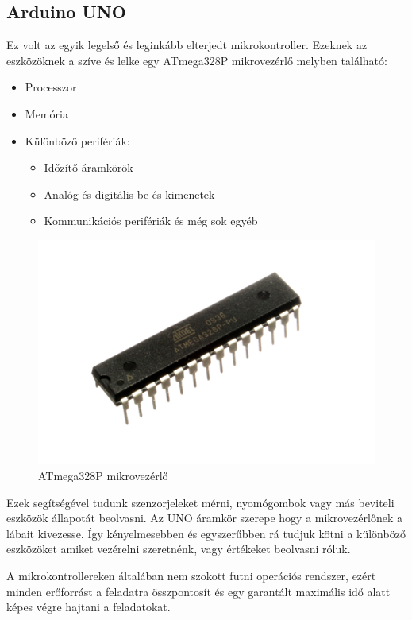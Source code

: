 \documentclass[]{thesis-ekf}
\theoremstyle{definition}
\theoremstyle{remark}
\begin{document}
\subsection{Arduino UNO}
Ez volt az egyik legelső és leginkább elterjedt mikrokontroller. Ezeknek az eszközöknek a szíve és lelke egy ATmega328P mikrovezérlő melyben található: 
\begin{itemize}
	\item Processzor
	\item Memória
	\item Különböző perifériák:
	\begin{itemize}
		\item Időzítő áramkörök
		\item Analóg és digitális be és kimenetek
		\item Kommunikációs perifériák és még sok egyéb
	\end{itemize}
\end{itemize}
\begin{figure}[th!]
	\centering
	\includegraphics[width=0.4\linewidth]{ATMEGA328P-PU}
	\caption[ATmega328P]{ATmega328P mikrovezérlő}
	\label{fig:atmega328p-pu}
\end{figure}
\pagebreak
Ezek segítségével tudunk szenzorjeleket mérni, nyomógombok vagy más beviteli eszközök állapotát beolvasni. Az UNO áramkör szerepe hogy a mikrovezérlőnek a lábait kivezesse. Így kényelmesebben és egyszerűbben rá tudjuk kötni a különböző eszközöket amiket vezérelni szeretnénk, vagy értékeket beolvasni róluk. 

A mikrokontrollereken általában nem szokott futni operációs rendszer, ezért minden erőforrást a feladatra összpontosít és egy garantált maximális idő alatt képes végre hajtani a feladatokat. 
\end{document}
